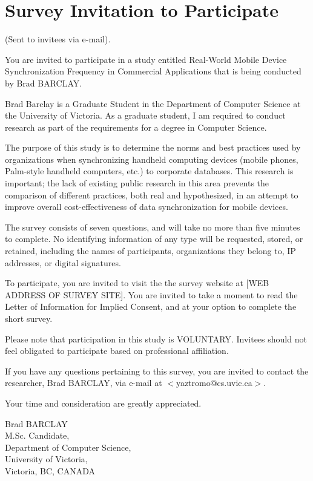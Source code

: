 \chapter{Survey Invitation to Participate}\label{surveyinvitation}

(Sent to invitees via e-mail).

You are invited to participate in a study entitled Real-World Mobile Device Synchronization Frequency in Commercial Applications that is being conducted by Brad BARCLAY.

Brad Barclay is a Graduate Student in the Department of Computer Science at the University of Victoria.  As a graduate student, I am  required to conduct research as part of the requirements for a degree in Computer Science.

The purpose of this study is to determine the norms and best practices used by organizations when synchronizing handheld computing devices (mobile phones, Palm-style handheld computers, etc.) to corporate databases.  This research is important; the lack of existing public research in this area prevents the comparison of different practices, both real and hypothesized, in an attempt to improve overall cost-effectiveness of data synchronization for mobile devices.

The survey consists of seven questions, and will take no more than five minutes to complete.  No identifying information of any type will be requested, stored, or retained, including the names of participants, organizations they belong to, IP addresses, or digital signatures.

To participate, you are invited to visit the the survey website at [WEB ADDRESS OF SURVEY SITE].  You are invited to take a moment to read the Letter of Information for Implied Consent, and at your option to complete the short survey.

Please note that participation in this study is VOLUNTARY.  Invitees should not feel obligated to participate based on professional affiliation.

If you have any questions pertaining to this survey, you are invited to contact the researcher, Brad BARCLAY, via e-mail at $<$yaztromo@cs.uvic.ca$>$.

Your time and consideration are greatly appreciated.
\begin{flushleft}
Brad BARCLAY\\
M.Sc. Candidate,\\
Department of Computer Science,\\
University of Victoria,\\
Victoria, BC, CANADA
\end{flushleft}

